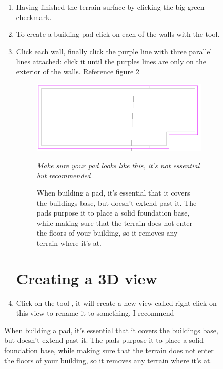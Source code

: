\documentclass{tufte-book} %
\begin{document}
\begin{figure}
\begin{enumerate}

	\section{Setting up a Building Pad}


	\item Having finished the terrain surface by clicking the big green checkmark.
	\item To create a building pad click on each of the walls with the  tool.
	\item Click each wall, finally click the purple line with three parallel lines attached: click it until the purples lines are only on the exterior of the walls. Reference figure \ref{fig:revtopopad}

	\begin{figure}
		\includegraphics[width=\linewidth]{revittopographicpad.png}
		\caption[Building Pad Lines]{When building a pad, it's essential that it covers the buildings base, but doesn't extend past it. The pads purpose it to place a solid foundation base, while making sure that the terrain does not enter the floors of your building, so it removes any terrain where it's at.}
		\emph{Make sure your pad looks like this, it's not essential but recommended}
		\label{fig:revtopopad}
	\end{figure}


	\section{Creating a 3D view}
	\item Click on the tool , it will create a new view called  right click on this view to rename it to something, I recommend 


\end{enumerate}
\end{figure}
\end{document}
